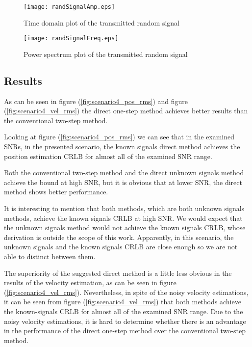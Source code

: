 \begin{figure}
\begin{center}
\texttt{[image: randSignalAmp.eps]} 
\end{center}
\caption{Time domain plot of the transmitted random signal}
\label{fig:randSignalAmp}
\end{figure}

\begin{figure}
\begin{center}
\texttt{[image: randSignalFreq.eps]} 
\end{center}
\caption{Power spectrum plot of the transmitted random signal}
\label{fig:randSignalFreq}
\end{figure}

\subsection*{Results}
As can be seen in figure (\ref{fig:scenario4_pos_rms}) and figure (\ref{fig:scenario4_vel_rms}) the direct one-step method achieves better results than the conventional two-step method.

Looking at figure (\ref{fig:scenario4_pos_rms}) we can see that in the examined SNRs, in the presented scenario, the known signals direct method achieves the position estimation CRLB for almost all of the examined SNR range.

Both the conventional two-step method and the direct unknown signals method achieve the bound at high SNR, but it is obvious that at lower SNR, the direct method shows better performance.

It is interesting to mention that both methods, which are both unknown signals methods, achieve the known signals CRLB at high SNR. We would expect that the unknown signals method would not achieve the known signals CRLB, whose derivation is outside the scope of this work. Apparently, in this scenario, the unknown signals and the known signals CRLB are close enough so we are not able to distinct between them.

The superiority of the suggested direct method is a little less obvious in the results of the velocity estimation, as can be seen in figure (\ref{fig:scenario4_vel_rms}). Nevertheless, in spite of the noisy velocity estimations, it can be seen from figure (\ref{fig:scenario4_vel_rms}) that both methods achieve the known-signals CRLB for almost all of the examined SNR range. Due to the noisy velocity estimations, it is hard to determine whether there is an advantage in the performance of the direct one-step method over the conventional two-step method.


